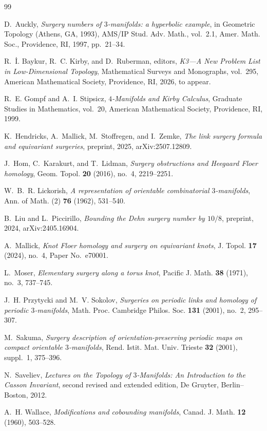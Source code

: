 \documentclass[11pt]{amsart}
\theoremstyle{definition}
\theoremstyle{remark}
\begin{document}
\begin{thebibliography}{99}

D.~Auckly,
\emph{Surgery numbers of $3$-manifolds: a hyperbolic example},
in Geometric Topology (Athens, GA, 1993), AMS/IP Stud. Adv. Math., vol.~2.1, Amer. Math. Soc., Providence, RI, 1997, pp.~21--34.

R.~\.I. Baykur, R.~C. Kirby, and D.~Ruberman, editors,
\emph{K3---A New Problem List in Low-Dimensional Topology},
Mathematical Surveys and Monographs, vol.~295, American Mathematical Society, Providence, RI, 2026, to appear.

R.~E. Gompf and A.~I. Stipsicz,
\emph{$4$-Manifolds and Kirby Calculus},
Graduate Studies in Mathematics, vol.~20, American Mathematical Society, Providence, RI, 1999.

K.~Hendricks, A.~Mallick, M.~Stoffregen, and I.~Zemke,
\emph{The link surgery formula and equivariant surgeries},
preprint, 2025, arXiv:2507.12809.

J.~Hom, C.~Karakurt, and T.~Lidman,
\emph{Surgery obstructions and Heegaard Floer homology},
Geom. Topol. \textbf{20} (2016), no.~4, 2219--2251.

W.~B.~R. Lickorish,
\emph{A representation of orientable combinatorial $3$-manifolds},
Ann. of Math. (2) \textbf{76} (1962), 531--540.

B.~Liu and L.~Piccirillo,
\emph{Bounding the Dehn surgery number by $10/8$},
preprint, 2024, arXiv:2405.16904.

A.~Mallick,
\emph{Knot Floer homology and surgery on equivariant knots},
J. Topol. \textbf{17} (2024), no.~4, Paper No.~e70001.

L.~Moser,
\emph{Elementary surgery along a torus knot},
Pacific J. Math. \textbf{38} (1971), no.~3, 737--745.

J.~H. Przytycki and M.~V. Sokolov,
\emph{Surgeries on periodic links and homology of periodic $3$-manifolds},
Math. Proc. Cambridge Philos. Soc. \textbf{131} (2001), no.~2, 295--307.

M.~Sakuma,
\emph{Surgery description of orientation-preserving periodic maps on compact orientable $3$-manifolds},
Rend. Istit. Mat. Univ. Trieste \textbf{32} (2001), suppl.~1, 375--396.

N.~Saveliev,
\emph{Lectures on the Topology of $3$-Manifolds: An Introduction to the Casson Invariant},
second revised and extended edition, De Gruyter, Berlin--Boston, 2012.

A.~H. Wallace,
\emph{Modifications and cobounding manifolds},
Canad. J. Math. \textbf{12} (1960), 503--528.

\end{thebibliography}
\end{document}
